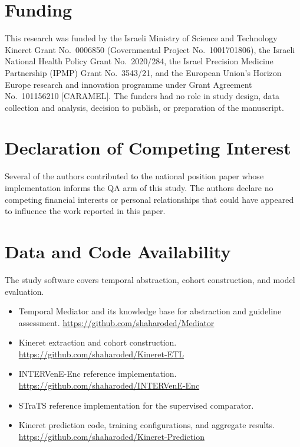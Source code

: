 \documentclass[preprint,12pt]{elsarticle}
\begin{document}
\section*{Funding}
This research was funded by the Israeli Ministry of Science and Technology
Kineret Grant No.~0006850 (Governmental Project No.~1001701806), the Israeli
National Health Policy Grant No.~2020/284, the Israel Precision Medicine
Partnership (IPMP) Grant No.~3543/21, and the European Union's Horizon Europe
research and innovation programme under Grant Agreement No.~101156210
[CARAMEL]. The funders had no role in study design, data collection and
analysis, decision to publish, or preparation of the manuscript.

\section*{Declaration of Competing Interest}
Several of the authors contributed to the national position paper whose
implementation informs the QA arm of this study. The authors declare no
competing financial interests or personal relationships that could have
appeared to influence the work reported in this paper.

\section*{Data and Code Availability}
The study software covers temporal abstraction, cohort construction, and model evaluation.

\begin{itemize}\setlength{\itemsep}{.1em}
\item Temporal Mediator and its knowledge base for abstraction and guideline assessment. \url{https://github.com/shaharoded/Mediator}
\item Kineret extraction and cohort construction. \url{https://github.com/shaharoded/Kineret-ETL}
\item INTERVenE-Enc reference implementation. \url{https://github.com/shaharoded/INTERVenE-Enc}
\item STraTS reference implementation for the supervised comparator.
\item Kineret prediction code, training configurations, and aggregate results. \url{https://github.com/shaharoded/Kineret-Prediction}
\end{itemize}
\end{document}
